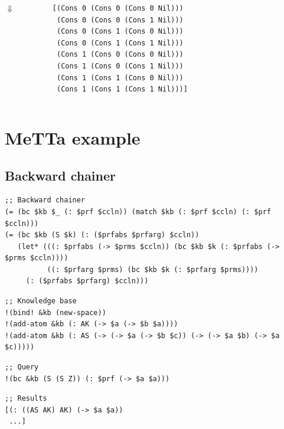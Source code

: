\documentclass[aspectratio=169]{beamer}
\begin{document}
\begin{frame}[fragile]
\begin{columns}
    \begin{center}
      $\Downarrow$
    \end{center}

    \begin{lstlisting}
      [(Cons 0 (Cons 0 (Cons 0 Nil)))
       (Cons 0 (Cons 0 (Cons 1 Nil)))
       (Cons 0 (Cons 1 (Cons 0 Nil)))
       (Cons 0 (Cons 1 (Cons 1 Nil)))
       (Cons 1 (Cons 0 (Cons 0 Nil)))
       (Cons 1 (Cons 0 (Cons 1 Nil)))
       (Cons 1 (Cons 1 (Cons 0 Nil)))
       (Cons 1 (Cons 1 (Cons 1 Nil)))]
    \end{lstlisting}

  \end{columns}

\end{frame}

\section{MeTTa example}

\subsection{Backward chainer}

\begin{frame}[fragile]
  \begin{lstlisting}
;; Backward chainer
(= (bc $kb $_ (: $prf $ccln)) (match $kb (: $prf $ccln) (: $prf $ccln)))
(= (bc $kb (S $k) (: ($prfabs $prfarg) $ccln))
   (let* (((: $prfabs (-> $prms $ccln)) (bc $kb $k (: $prfabs (-> $prms $ccln))))
          ((: $prfarg $prms) (bc $kb $k (: $prfarg $prms))))
     (: ($prfabs $prfarg) $ccln)))
  \end{lstlisting}

  \pause

  \begin{lstlisting}
;; Knowledge base
!(bind! &kb (new-space))
!(add-atom &kb (: AK (-> $a (-> $b $a))))
!(add-atom &kb (: AS (-> (-> $a (-> $b $c)) (-> (-> $a $b) (-> $a $c)))))
  \end{lstlisting}

  \pause

  \begin{lstlisting}
;; Query
!(bc &kb (S (S Z)) (: $prf (-> $a $a)))
  \end{lstlisting}

  \pause

  \begin{lstlisting}
;; Results
[(: ((AS AK) AK) (-> $a $a))
 ...]
  \end{lstlisting}

\end{frame}
\end{document}
